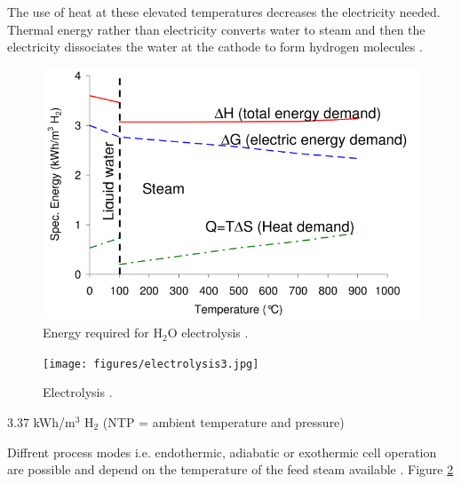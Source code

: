 \documentclass[11pt,letterpaper]{article}
\begin{document}
The use of heat at these elevated temperatures decreases the electricity needed.
Thermal energy rather than electricity converts water to steam and then the electricity dissociates the water at the cathode to form hydrogen molecules \cite{xu_introduction_2017}.

\begin{figure}[] %
	\centering
	\includegraphics[width=0.6\linewidth]{figures/electrolysis2.png}
	\hfill
	\caption{Energy required for H$_2$O electrolysis \cite{helmeth_high_2020}.}
	\label{fig:nf2}
\end{figure}

\begin{figure}[] %
	\centering
	\texttt{[image: figures/electrolysis3.jpg]}
	\hfill
	\caption{ Electrolysis \cite{doenitz_concepts_1982}.}
	\label{fig:electro3}
\end{figure}

3.37 kWh/m$^3$ H$_2$ (NTP = ambient temperature and pressure)
\cite{helmeth_high_2020}

Diffrent process modes i.e. endothermic, adiabatic or exothermic cell operation are possible and depend on the temperature of the feed steam available \cite{doenitz_concepts_1982}. Figure \ref{fig:electro3}


\pagebreak


\end{document}
